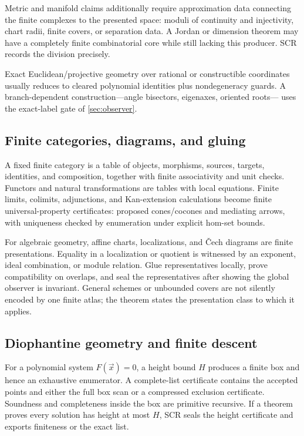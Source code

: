 Metric and manifold claims additionally require approximation data connecting
the finite complexes to the presented space: moduli of continuity and
injectivity, chart radii, finite covers, or separation data.  A Jordan or
dimension theorem may have a completely finite combinatorial core while still
lacking this producer.  SCR records the division precisely.

Exact Euclidean/projective geometry over rational or constructible coordinates
usually reduces to cleared polynomial identities plus nondegeneracy guards.
A branch-dependent construction---angle bisectors, eigenaxes, oriented roots---
uses the exact-label gate of \cref{sec:observer}.

\subsection{Finite categories, diagrams, and gluing}

A fixed finite category is a table of objects, morphisms, sources, targets,
identities, and composition, together with finite associativity and unit
checks.  Functors and natural transformations are tables with local equations.
Finite limits, colimits, adjunctions, and Kan-extension calculations become
finite universal-property certificates: proposed cones/cocones and mediating
arrows, with uniqueness checked by enumeration under explicit hom-set bounds.

For algebraic geometry, affine charts, localizations, and \v{C}ech diagrams are
finite presentations.  Equality in a localization or quotient is witnessed by
an exponent, ideal combination, or module relation.  Glue representatives
locally, prove compatibility on overlaps, and seal the representatives after
showing the global observer is invariant.  General schemes or unbounded
covers are not silently encoded by one finite atlas; the theorem states the
presentation class to which it applies.

\subsection{Diophantine geometry and finite descent}

For a polynomial system \(F(\vec x)=0\), a height bound \(H\) produces a finite
box and hence an exhaustive enumerator.  A complete-list certificate contains
the accepted points and either the full box scan or a compressed exclusion
certificate.  Soundness and completeness inside the box are primitive
recursive.  If a theorem proves every solution has height at most \(H\), SCR
seals the height certificate and exports finiteness or the exact list.

